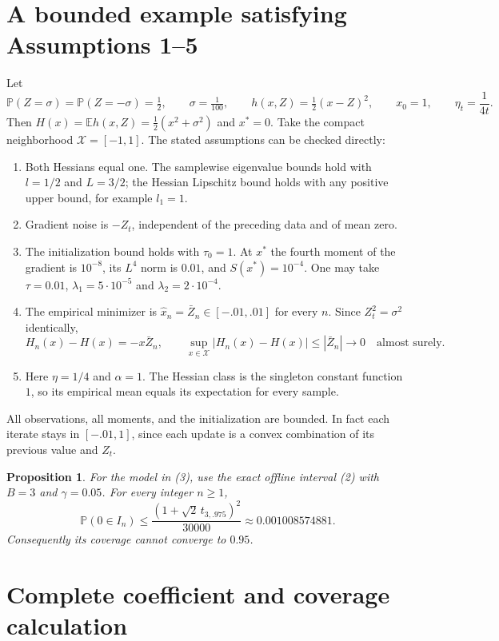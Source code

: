 \documentclass[11pt]{article}
\newtheorem{proposition}{Proposition}
\newcommand{\E}{\mathbb E}
\newcommand{\Pp}{\mathbb P}
\begin{document}
\section{A bounded example satisfying Assumptions 1--5}

Let
\[
 \Pp(Z=\sigma)=\Pp(Z=-\sigma)=\tfrac12,\qquad
 \sigma=\tfrac1{100},\qquad
 h(x,Z)=\tfrac12(x-Z)^2,\qquad x_0=1,\qquad
 \eta_t=\frac1{4t}.
 \tag{3}
\]
Then $H(x)=\E h(x,Z)=\tfrac12(x^2+\sigma^2)$ and $x^*=0$.
Take the compact neighborhood $\mathcal X=[-1,1]$.
The stated assumptions can be checked directly:
\begin{enumerate}
 \item Both Hessians equal one. The samplewise eigenvalue bounds hold
 with $l=1/2$ and $L=3/2$; the Hessian Lipschitz bound holds with
 any positive upper bound, for example $l_1=1$.
 \item Gradient noise is $-Z_t$, independent of the preceding data
 and of mean zero.
 \item The initialization bound holds with $\tau_0=1$.
 At $x^*$ the fourth moment of the gradient is $10^{-8}$, its
 $L^4$ norm is $0.01$, and $S(x^*)=10^{-4}$.
 One may take $\tau=0.01$, $\lambda_1=5\cdot10^{-5}$ and
 $\lambda_2=2\cdot10^{-4}$.
 \item The empirical minimizer is $\hat x_n=\bar Z_n\in[-.01,.01]$
 for every $n$. Since $Z_t^2=\sigma^2$ identically,
 \[
 H_n(x)-H(x)=-x\bar Z_n,\qquad
 \sup_{x\in\mathcal X}|H_n(x)-H(x)|
 \le |\bar Z_n|\longrightarrow0\quad\text{almost surely}.
 \]
 \item Here $\eta=1/4$ and $\alpha=1$. The Hessian class is the
 singleton constant function $1$, so its empirical mean equals
 its expectation for every sample.
\end{enumerate}
All observations, all moments, and the initialization are bounded.
In fact each iterate stays in $[-.01,1]$, since each update is a
convex combination of its previous value and $Z_t$.

\begin{proposition}\label{prop:bound}
For the model in (3), use the exact offline interval (2) with
$B=3$ and $\gamma=0.05$. For every integer $n\ge1$,
\[
 \Pp(0\in I_n)
 \le \frac{(1+\sqrt2\,t_{3,.975})^2}{30000}
 \approx0.001008574881.
 \tag{4}
\]
Consequently its coverage cannot converge to $0.95$.
\end{proposition}

\section{Complete coefficient and coverage calculation}
\end{document}

